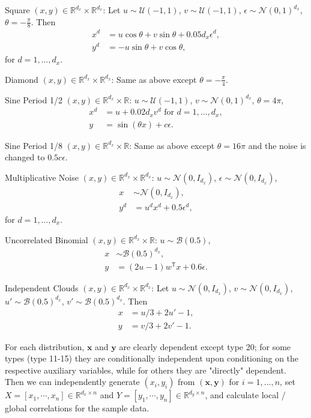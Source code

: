 \documentclass[11pt]{article}
\providecommand{\mb}[1]{\boldsymbol{#1}}
\providecommand{\mc}[1]{\mathcal{#1}}
\newcommand{\Real}{\mathbb{R}}
\newcommand{\T}{^{\ensuremath{\mathsf{T}}}}           %
\begin{document}
\begin{compactenum}
\item Square $(x,y) \in \Real^{d_{x}} \times \Real^{d_{x}}$: Let $u \sim \mc{U}(-1,1)$, $v \sim \mc{U}(-1,1)$, $\epsilon \sim \mc{N}(0,1)^{d_{x}}$, $\theta=-\frac{\pi}{8}$. Then
\begin{align*}
x^{d}&=u \cos\theta + v \sin\theta + 0.05 d_{x}\epsilon^{d},\\
y^{d}&=-u \sin\theta + v \cos\theta,
\end{align*}
for $d=1,\ldots,d_{x}$.
\item Diamond $(x,y) \in \Real^{d_{x}} \times \Real^{d_{x}}$: Same as above except $\theta=-\frac{\pi}{4}$.
\item Sine Period 1/2 $(x,y) \in \Real^{d_{x}} \times \Real$: $u \sim \mc{U}(-1,1)$, $v \sim \mc{N}(0,1)^{d_{x}}$, $\theta=4\pi$,
\begin{align*}
x^{d}&=u+0.02 d_{x} v^{d} \mbox{ for $d=1,\ldots,d_{x}$}, \\
y&=\sin ( \theta x )+c\epsilon.
\end{align*}
\item Sine Period 1/8 $(x,y) \in \Real^{d_{x}} \times \Real$: Same as above except $\theta=16\pi$ and the noise is changed to $0.5c\epsilon$.
\item Multiplicative Noise $(x,y) \in \Real^{d_{x}} \times \Real^{d_{x}}$: $u \sim \mc{N}(0, I_{d_{x}})$, $\epsilon \sim \mc{N}(0, I_{d_{x}})$,
\begin{align*}
x &\sim \mc{N}(0, I_{d_{x}}),\\
y^{d}&=u^{d}x^{d}+0.5\epsilon^{d},
\end{align*}
for $d=1,\ldots,d_{x}$.
\item Uncorrelated Binomial $(x,y) \in \Real^{d_{x}} \times \Real$: $u \sim \mc{B}(0.5)$,
\begin{align*}
x &\sim \mc{B}(0.5)^{d_{x}},\\ 
y&=(2u-1)w\T x+0.6\epsilon.
\end{align*}
\item Independent Clouds $(x,y) \in \Real^{d_{x}} \times \Real^{d_{x}}$: Let $u \sim \mc{N}(0,I_{d_{x}})$, $v \sim \mc{N}(0,I_{d_{x}})$, $u' \sim \mc{B}(0.5)^{d_{x}}$, $v' \sim \mc{B}(0.5)^{d_{x}}$. Then
\begin{align*}
x&=u/3+2u'-1,\\
y&=v/3+2v'-1.
\end{align*}
\end{compactenum}

For each distribution, $\mb{x}$ and $\mb{y}$ are clearly dependent except type 20; for some types (type 11-15) they are conditionally independent upon conditioning on the respective auxiliary variables, while for others they are "directly" dependent. Then we can independently generate $(x_{i},y_{i})$ from $(\mb{x},\mb{y})$ for $i=1,\ldots,n$, set $X=[x_{1},\cdots, x_{n}] \in \Real^{d_{x} \times n}$ and $Y=[y_{1},\cdots, y_{n}] \in \Real^{d_{y} \times n}$, and calculate local / global correlations for the sample data.
\end{document}
